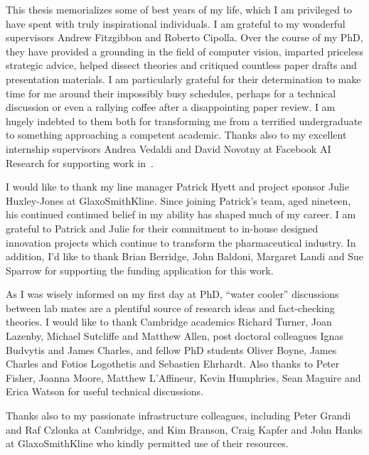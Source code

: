 
\begin{acknowledgements}      


This thesis memorializes some of best years of my life, which I am privileged to have spent with truly inspirational individuals. I am grateful to my wonderful supervisors Andrew Fitzgibbon and Roberto Cipolla. Over the course of my PhD, they have provided a grounding in the field of computer vision, imparted priceless strategic advice, helped dissect theories and critiqued countless paper drafts and presentation materials. I am particularly grateful for their determination to make time for me around their impossibly busy schedules, perhaps for a technical discussion or even a rallying coffee after a disappointing paper review. I am hugely indebted to them both for transforming me from a terrified undergraduate to something approaching a competent academic. Thanks also to my excellent internship supervisors Andrea Vedaldi and David Novotny at Facebook AI Research for supporting work in~.

I would like to thank my line manager Patrick Hyett and project sponsor Julie Huxley-Jones at GlaxoSmithKline. Since joining Patrick's team, aged nineteen, his continued continued belief in my ability has shaped much of my career. I am grateful to Patrick and Julie for their commitment to in-house designed innovation projects which continue to transform the pharmaceutical industry. In addition, I'd like to thank Brian Berridge, John Baldoni, Margaret Landi and Sue Sparrow for supporting the funding application for this work.

As I was wisely informed on my first day at PhD, ``water cooler'' discussions between lab mates are a plentiful source of research ideas and fact-checking theories. I would like to thank Cambridge academics Richard Turner, Joan Lazenby, Michael Sutcliffe and Matthew Allen, post doctoral colleagues Ignas Budvytis and James Charles, and fellow PhD students Oliver Boyne, James Charles and Fotios Logothetis and Sebastien Ehrhardt. Also thanks to Peter Fisher, Joanna Moore, Matthew L'Affineur, Kevin Humphries, Sean Maguire and Erica Watson for useful technical discussions. 

Thanks also to my passionate infrastructure colleagues, including Peter Grandi and Raf Czlonka at Cambridge, and Kim Branson, Craig Kapfer and John Hanks at GlaxoSmithKline who kindly permitted use of their resources.


\end{acknowledgements}
